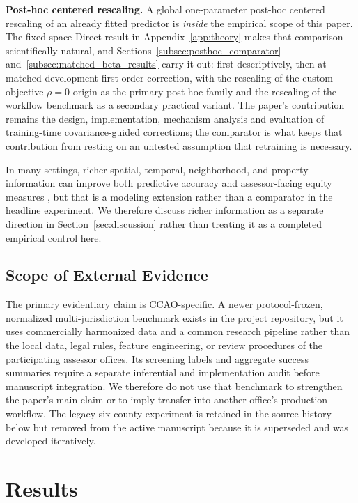 \documentclass[10pt]{article}
\theoremstyle{definition}
\newcommand{\1}{\mathbf{1}}
\begin{document}
\textbf{Post-hoc centered rescaling.} A global one-parameter post-hoc centered rescaling of an already fitted predictor is \emph{inside} the empirical scope of this paper. The fixed-space Direct result in Appendix~\ref{app:theory} makes that comparison scientifically natural, and Sections~\ref{subsec:posthoc_comparator} and~\ref{subsec:matched_beta_results} carry it out: first descriptively, then at matched development first-order correction, with the rescaling of the custom-objective $\rho=0$ origin as the primary post-hoc family and the rescaling of the workflow benchmark as a secondary practical variant. The paper's contribution remains the design, implementation, mechanism analysis and evaluation of training-time covariance-guided corrections; the comparator is what keeps that contribution from resting on an untested assumption that retraining is necessary.


In many settings, richer spatial, temporal, neighborhood, and property information can improve both predictive accuracy and assessor-facing equity measures \cite{SmithEtAl2026}, but that is a modeling extension rather than a comparator in the headline experiment. We therefore discuss richer information as a separate direction in Section~\ref{sec:discussion} rather than treating it as a completed empirical control here.


\subsection{Scope of External Evidence}
\label{subsec:external_scope}

The primary evidentiary claim is CCAO-specific. A newer protocol-frozen, normalized multi-jurisdiction benchmark exists in the project repository, but it uses commercially harmonized data and a common research pipeline rather than the local data, legal rules, feature engineering, or review procedures of the participating assessor offices. Its screening labels and aggregate success summaries require a separate inferential and implementation audit before manuscript integration. We therefore do not use that benchmark to strengthen the paper's main claim or to imply transfer into another office's production workflow. The legacy six-county experiment is retained in the source history below but removed from the active manuscript because it is superseded and was developed iteratively.


\section{Results}
\label{sec:results}
\end{document}
